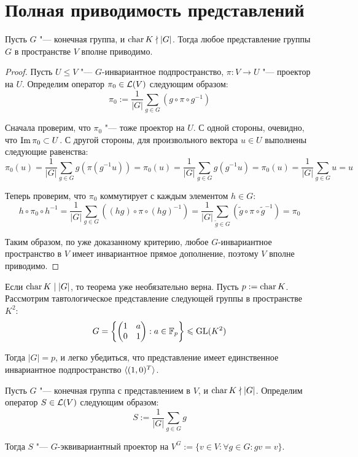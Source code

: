 \section{Полная приводимость представлений}

\begin{theorem}
	Пусть $G$ "--- конечная группа, и $\operatorname{char}{K} \nmid |G|$. Тогда любое представление группы $G$ в пространстве $V$ вполне приводимо.
\end{theorem}

\begin{proof}
	Пусть $U \le V$ "--- $G$-инвариантное подпространство, $\pi : V \to U$ "--- проектор на $U$. Определим оператор $\pi_0 \in \mathcal L(V)$ следующим образом:
	\[\pi_0 := \frac1{|G|}\sum_{g \in G}(g\circ\pi\circ g^{-1})\]
	
	Сначала проверим, что $\pi_0$ "--- тоже проектор на $U$. С одной стороны, очевидно, что $\operatorname{Im}\pi_0 \subset U$. С другой стороны, для произвольного вектора $u \in U$ выполнены следующие равенства:
	\[\pi_0(u) = \frac1{|G|}\sum_{g \in G}g(\pi(g^{-1}u)) = \pi_0(u) = \frac1{|G|}\sum_{g \in G}g(g^{-1}u) = \pi_0(u) = \frac1{|G|}\sum_{g \in G}u = u\]
	
	Теперь проверим, что $\pi_0$ коммутирует с каждым элементом $h \in G$:
	\[h\circ\pi_0\circ h^{-1} = \frac1{|G|}\sum_{g \in G}((hg)\circ\pi\circ (hg)^{-1}) = \frac1{|G|}\sum_{\widetilde g \in G}(\widetilde g\circ\pi\circ \widetilde g^{-1}) = \pi_0\]
	
	Таким образом, по уже доказанному критерию, любое $G$-инвариантное пространство в $V$ имеет инвариантное прямое дополнение, поэтому $V$ вполне приводимо.
\end{proof}

\begin{note}
	Если $\operatorname{char}{K} \mid |G|$, то теорема уже необязательно верна. Пусть $p := \operatorname{char}{K}$. Рассмотрим тавтологическое представление следующей группы в пространстве $K^2$:
	\[G = \left\{\begin{pmatrix}
		1&a\\
		0&1
	\end{pmatrix} : a \in \mathbb{F}_p\right\} \leqslant \operatorname{GL}(K^2)\]

	Тогда $|G| = p$, и легко убедиться, что представление имеет единственное инвариантное подпространство $\langle(1, 0)^T\rangle$.
\end{note}

\begin{theorem}
	Пусть $G$ "--- конечная группа с представлением в $V$, и $\operatorname{char}{K} \nmid |G|$. Определим оператор $S \in \mathcal L(V)$ следующим образом:
	\[S := \frac1{|G|}\sum_{g \in G}g\]
	
	Тогда $S$ "--- $G$-эквивариантный проектор на $V^G := \{v \in V: \forall g \in G: gv=v\}$.
\end{theorem}


